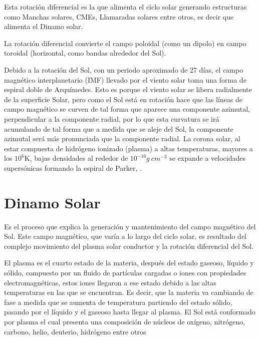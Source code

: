 Esta rotación diferencial es la que alimenta el ciclo solar generando estructuras como Manchas solares, \acp{CME}, Llamaradas solares entre otros, es decir que alimenta el Dinamo solar.

La rotación diferencial convierte el campo poloidal (como un dipolo) en campo toroidal (horizontal, como bandas alrededor del Sol).

Debido a la rotación del Sol, con un periodo aproximado de 27 días, el campo magnético interplanetario (IMF) llevado por el viento solar toma una forma de espiral doble de Arquímedes. Esto es porque el viento solar se libera radialmente de la superficie Solar, pero como el Sol está en rotación hace que las líneas de campo magnético se curven de tal forma que aparece una componente azimutal, perpendicular a la componente radial, por lo que esta curvatura se irá acumulando de tal forma que a medida que se aleje del Sol, la componente azimutal será más pronunciada que la componente radial. 
La corona solar, al estar compuesta de hidrógeno ionizado (plasma) a altas temperaturas, mayores a los $10^{6}$K, bajas densidades al rededor de $10^{-16}g~cm^{-3}$ se expande a velocidades supersónicas formando la espiral de Parker, \cite[e.g.,]{lugaz-2005}.


\section{Dinamo Solar}
Es el proceso que explica la generación y mantenimiento del campo magnético del Sol. Este campo magnético, que varía a lo largo del ciclo solar, es resultado del complejo movimiento del plasma solar conductor y la rotación diferencial del Sol. 

El plasma es el cuarto estado de la materia, después del estado gaseoso, líquido y sólido, compuesto por un fluido de partículas cargadas o iones con propiedades electromagnéticas, estos iones llegaron a ese estado debido a las altas temperaturas en las que se encuentran. Es decir, que la materia va cambiando de fase a medida que se aumenta de temperatura partiendo del estado sólido, pasando por el líquido y el gaseoso hasta llegar al plasma. El Sol está conformado por plasma \cite[e.g,][]{cermak-2025} el cual presenta una composición de núcleos de oxígeno, nitrógeno, carbono, helio, deuterio, hidrógeno entre otros \cite[e.g.,][]{asplund-2009}

